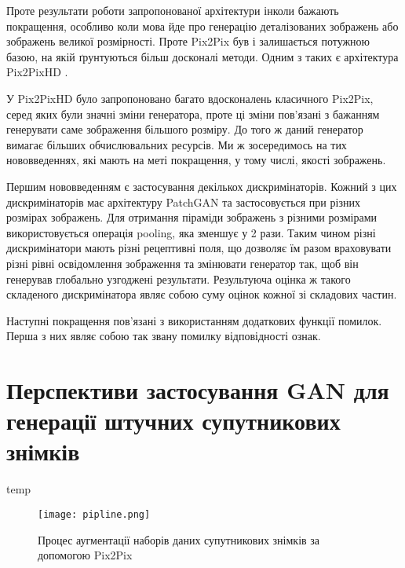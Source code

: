 Проте результати роботи запропонованої архітектури інколи
бажають покращення, особливо коли мова йде про генерацію
деталізованих зображень або зображень великої розмірності.
Проте Pix2Pix був і залишається потужною базою, на якій
ґрунтуються більш досконалі методи. Одним з таких є архітектура
Pix2PixHD \cite{pix2pixHD}.

У Pix2PixHD було запропоновано багато вдосконалень класичного
Pix2Pix, серед яких були значні зміни генератора, проте
ці зміни пов'язані з бажанням генерувати саме зображення
більшого розміру. До того ж даний генератор вимагає
більших обчислювальних ресурсів. Ми ж зосередимось на
тих нововведеннях, які мають на меті покращення, у тому числі,
якості зображень.

Першим нововведенням є застосування декількох дискримінаторів.
Кожний з цих дискримінаторів має архітектуру PatchGAN та застосовується
при різних розмірах зображень. Для отримання піраміди зображень
з різними розмірами використовується операція pooling, яка зменшує
у 2 рази. Таким чином різні дискримінатори мають різні рецептивні
поля, що дозволяє їм разом враховувати різні рівні освідомлення
зображення та змінювати генератор так, щоб він генерував
глобально узгоджені результати. Результуюча оцінка ж такого
складеного дискримінатора являє собою суму оцінок кожної
зі складових частин.

Наступні покращення пов'язані з використанням додаткових
функції помилок. Перша з них являє собою так звану помилку
відповідності ознак.

\section{Перспективи застосування GAN для генерації штучних супутникових знімків}

temp

\begin{figure}[!ht]
    \centering
    \texttt{[image: pipline.png]}
    \caption{Процес аугментації наборів даних супутникових знімків за допомогою Pix2Pix}
    \label{fig:pipline}
\end{figure}

